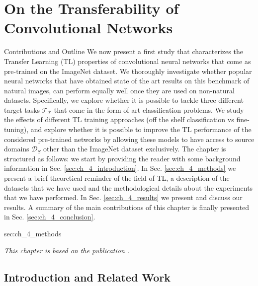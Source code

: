 \chapter{On the Transferability of Convolutional Networks}
\label{ch:tl_natural_to_non_natural}

\begin{remark}{Contributions and Outline} 
	We now present a first study that characterizes the Transfer Learning (TL) properties of convolutional neural networks that come as pre-trained on the ImageNet dataset. We thoroughly investigate whether popular neural networks that have obtained state of the art results on this benchmark of natural images, can perform equally well once they are used on non-natural datasets. Specifically, we explore whether it is possible to tackle three different target tasks $\mathcal{T_T}$ that come in the form of art classification problems. We study the effects of different TL training approaches (off the shelf classification vs fine-tuning), and explore whether it is possible to improve the TL performance of the considered pre-trained networks by allowing these models to have access to source domains $\mathcal{D}_S$ other than the ImageNet dataset exclusively. The chapter is structured as follows: we start by providing the reader with some background information in Sec. \ref{sec:ch_4_introduction}. In Sec. \ref{sec:ch_4_methods} we present a brief theoretical reminder of the field of TL, a description of the datasets that we have used and the methodological details about the experiments that we have performed. In Sec. \ref{sec:ch_4_results} we present and discuss our results. A summary of the main contributions of this chapter is finally presented in Sec. \ref{sec:ch_4_conclusion}.

sec:ch_4_methods\vspace{5mm}

\textit{This chapter is based on the publication \citet{sabatelli2018deep}.}
\end{remark}



\iffalse
\section{Introduction and Related Work}
\label{sec:introduction}


